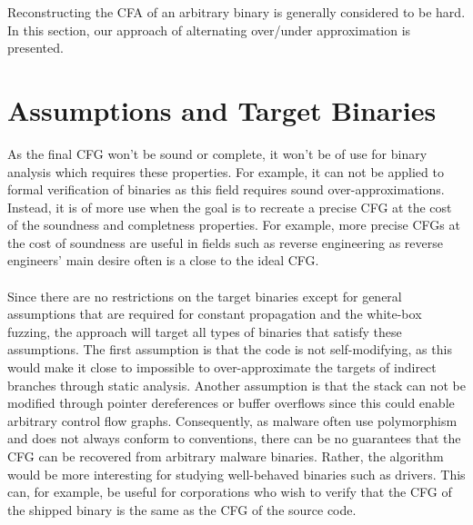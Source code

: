 \documentclass{kththesis}
\begin{document}

Reconstructing the CFA of an arbitrary binary is generally considered to be hard\cite{Jakstab}. In this section, our approach of alternating over/under approximation is presented. %

\section{Assumptions and Target Binaries}
%
%
%
%
As the final CFG won't be sound or complete, it won't be of use for binary analysis which requires these properties. For example, it can not be applied to formal verification of binaries as this field requires sound over-approximations. Instead, it is of more use when the goal is to recreate a precise CFG at the cost of the soundness and completness properties. For example, more precise CFGs at the cost of soundness are useful in fields such as reverse engineering as reverse engineers' main desire often is a close to the ideal CFG.
\\ \\
Since there are no restrictions on the target binaries except for general assumptions that are required for constant propagation and the white-box fuzzing, the approach will target all types of binaries that satisfy these assumptions. The first assumption is that the code is not self-modifying, as this would make it close to impossible to over-approximate the targets of indirect branches through static analysis. Another assumption is that the stack can not be modified through pointer dereferences or buffer overflows since this could enable arbitrary control flow graphs. Consequently, as malware often use polymorphism and does not always conform to conventions, there can be no guarantees that the CFG can be recovered from arbitrary malware binaries. Rather, the algorithm would be more interesting for studying well-behaved binaries such as drivers. This can, for example, be useful for corporations who wish to verify that the CFG of the shipped binary is the same as the CFG of the source code.
\end{document}
